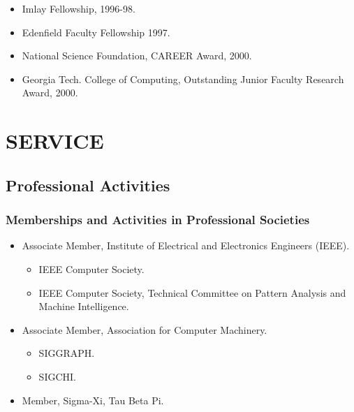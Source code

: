\begin{itemize}

\item Imlay Fellowship, 1996-98.


\item Edenfield Faculty Fellowship 1997.

\item National Science Foundation, CAREER Award, 2000.

\item Georgia Tech. College of Computing, Outstanding Junior
Faculty Research Award, 2000.

\end{itemize}


\newpage
\section{SERVICE}
\label{sec:serviceld}

\subsection{Professional Activities}
\label{subsec:professional}

\subsubsection{Memberships and Activities in Professional Societies}
\label{subsubsec:memberships}

\begin{itemize}

\item Associate Member, Institute of Electrical and Electronics
Engineers (IEEE).

\begin{itemize}
\item IEEE Computer Society.

\item IEEE Computer Society, Technical Committee on Pattern Analysis
and Machine Intelligence.
\end{itemize}

\item Associate Member, Association for Computer Machinery.

\begin{itemize}
\item SIGGRAPH.
\item SIGCHI.
\end{itemize}

\item Member, Sigma-Xi, Tau Beta Pi.
\end{itemize}

